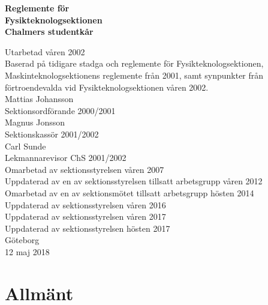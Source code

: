 \documentclass[11pt,a4paper]{article}
\begin{document}

\setlength{\headheight}{14pt}

  \begin{center}
    \textbf{\Huge{Reglemente för}}\\[3mm]
    \textbf{\Huge{Fysikteknologsektionen}}\\
    \vspace{.7 cm}
    \textbf{\Large{Chalmers studentkår}}
    
    
    \vfill
    
    Utarbetad våren 2002\\[5mm]
    Baserad på tidigare stadga och reglemente för Fysikteknologsektionen,
    Maskinteknologsektionens reglemente från 2001, samt synpunkter
    från förtroendevalda vid Fysikteknologsektionen våren 2002.\\[5mm]
    Mattias Johansson\\
    Sektionsordförande 2000/2001\\[5mm]
    Magnus Jonsson\\
    Sektionskassör 2001/2002\\[5mm]
    Carl Sunde\\
    Lekmannarevisor ChS 2001/2002\\[5mm]
    Omarbetad av sektionsstyrelsen våren 2007\\[5mm]
    Uppdaterad av en av sektionsstyrelsen tillsatt arbetsgrupp våren 2012\\[5mm]
    Omarbetad av en av sektionsmötet tillsatt arbetsgrupp hösten 2014 \\[5mm]
    Uppdaterad av sektionsstyrelsen våren 2016 \\
    Uppdaterad av sektionsstyrelsen våren 2017 \\
    Uppdaterad av sektionsstyrelsen hösten 2017 \\
    \vspace{.3 cm}
    \small{Göteborg}\\
    \small{12 maj 2018}
  \end{center}

\clearpage


\tableofcontents

\clearpage


\section{Allmänt}
\end{document}

